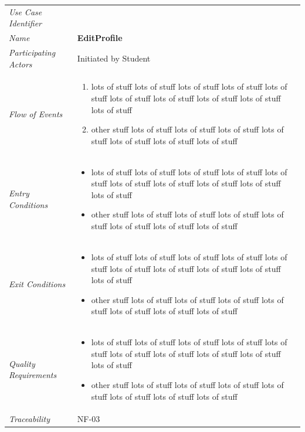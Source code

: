 \documentclass[12pt,letterpaper]{article}
\begin{document}
\begin{center}
	\begin{tabu} to 
		\toprule
		Use Case Identifier & \editprofile{} \\
		Name & {\bf EditProfile} \\
		Participating Actors & Initiated by Student \\
		Flow of Events & 
	    \begin{enumerate}[topsep=-1em]
		    \item lots of stuff lots of stuff lots of stuff lots of stuff lots of stuff lots of stuff lots of stuff lots of stuff lots of stuff lots of stuff
		    \item other stuff lots of stuff lots of stuff lots of stuff lots of stuff lots of stuff lots of stuff lots of stuff
		\end{enumerate} \\

		Entry Conditions &
		\begin{itemize}[topsep=-1em]
		    \item lots of stuff lots of stuff lots of stuff lots of stuff lots of stuff lots of stuff lots of stuff lots of stuff lots of stuff lots of stuff
		    \item other stuff lots of stuff lots of stuff lots of stuff lots of stuff lots of stuff lots of stuff lots of stuff
        \end{itemize} \\

		Exit Conditions &
		\begin{itemize}[topsep=-1em]
		    \item lots of stuff lots of stuff lots of stuff lots of stuff lots of stuff lots of stuff lots of stuff lots of stuff lots of stuff lots of stuff
		    \item other stuff lots of stuff lots of stuff lots of stuff lots of stuff lots of stuff lots of stuff lots of stuff
        \end{itemize} \\

		Quality Requirements &
		\begin{itemize}[topsep=-1em]
		    \item lots of stuff lots of stuff lots of stuff lots of stuff lots of stuff lots of stuff lots of stuff lots of stuff lots of stuff lots of stuff
		    \item other stuff lots of stuff lots of stuff lots of stuff lots of stuff lots of stuff lots of stuff lots of stuff
        \end{itemize} \\

		Traceability & NF-03 \\
		\toprule
	\end{tabu}
\end{center}
\end{document}
